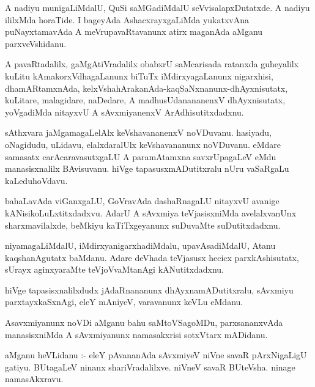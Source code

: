 \documentclass{article}
\begin{document}
\begin{mn}
A nadiyu munigaLiMdalU, QuSi saMGadiMdalU  seVvisalapxDutatxde.  A nadiyu  
ililxMda  horaTide.  I bageyAda AshacxrayxgaLiMda yukatxvAna puNayxtamavAda 
A meVrupavaRtavanunx atirx maganAda aMganu parxveVshidanu.
\end{mn}

\begin{mn}
A pavaRtadalilx, gaMgAtiVradalilx obabxrU saMcarisada ratanxda guheyalilx 
kuLitu kAmakorxVdhagaLanunx biTuTx iMdirxyagaLanunx nigarxhisi, dhamARtamxnAda, 
kelxVshahArakanAda-kaqSaNxnanunx-dhAyxnisutatx, kuLitare, malagidare, naDedare, 
A madhusUdanananenxV  dhAyxnisutatx, yoVgadiMda nitayxvU A sAvxmiyanenxV ArAdhisutitxdadxnu.
\end{mn}

\begin{mn}
sAthxvara jaMgamagaLelAlx  keVshavananenxV  noVDuvanu. hasiyadu, oNagidudu, 
uLidavu,  elalxdaralUlx keVshavananunx noVDuvanu. eMdare samasatx carAcaravasutxgaLU 
A  paramAtamxna savxrUpagaLeV eMdu manasisxnalilx BAvisuvanu.  hiVge 
tapasusxmADutitxralu nUru vaSaRgaLu kaLeduhoVdavu. 
\end{mn}

\begin{mn}
bahaLavAda viGanxgaLU, GoVravAda dashaRnagaLU nitayxvU avanige kANisikoLuLxtitxdadxvu.  
AdarU A sAvxmiya teVjasisxniMda avelalxvanUnx sharxmavilalxde, beMkiyu 
kaTiTxgeyanunx suDuvaMte suDutitxdadxnu.  
\end{mn}

\begin{mn}
niyamagaLiMdalU, iMdirxyanigarxhadiMdalu, upavAsadiMdalU, Atanu kaqshanAgutatx 
baMdanu.  Adare deVhada teVjasusx hecicx parxkAshisutatx, sUrayx aginxyaraMte 
teVjoVvaMtanAgi kANutitxdadxnu. 
\end{mn}

\begin{mn}
hiVge tapasisxnalilxdudx jAdaRnananunx dhAyxnamADutitxralu, sAvxmiyu parxtayxkaSxnAgi, 
eleY mAniyeV, varavanunx keVLu eMdanu.
\end{mn}

\begin{mn}
Asavxmiyanunx noVDi aMganu bahu saMtoVSagoMDu, parxsananxvAda manasisxniMda 
A sAvxmiyanunx namasakxrisi sotxVtarx mADidanu. 
\end{mn}

\begin{mn}
aMganu heVLidanu :- eleY pAvananAda sAvxmiyeV niVne savaR pArxNigaLigU gatiyu. 
BUtagaLeV ninanx shariVradalilxve.  niVneV savaR BUteVsha.  ninage namasAkxravu.
\end{mn}
\end{document}
